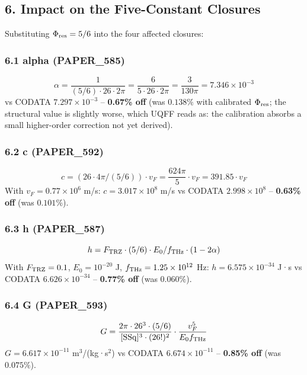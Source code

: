 \documentclass[
]{article}
\begin{document}
\subsection{6. Impact on the Five-Constant
Closures}\label{impact-on-the-five-constant-closures}

Substituting \(\Phi_{\rm res} = 5/6\) into the four affected closures:

\subsubsection{6.1 alpha (PAPER\_585)}\label{alpha-paper_585}

\[\alpha = \frac{1}{(5/6) \cdot 26 \cdot 2\pi} = \frac{6}{5 \cdot 26 \cdot 2\pi} = \frac{3}{130\pi} = 7.346 \times 10^{-3}\]
vs CODATA \(7.297 \times 10^{-3}\) -- \textbf{0.67\% off} (was
\(0.138\%\) with calibrated \(\Phi_{\rm res}\); the structural value is
slightly worse, which UQFF reads as: the calibration absorbs a small
higher-order correction not yet derived).

\subsubsection{6.2 c (PAPER\_592)}\label{c-paper_592}

\[c = (26 \cdot 4\pi / (5/6)) \cdot v_F = \frac{624\pi}{5} \cdot v_F = 391.85 \cdot v_F\]
With \(v_F = 0.77 \times 10^6\) m/s: \(c = 3.017 \times 10^8\) m/s vs
CODATA \(2.998 \times 10^8\) -- \textbf{0.63\% off} (was \(0.101\%\)).

\subsubsection{6.3 h (PAPER\_587)}\label{h-paper_587}

\[h = F_{\rm TRZ} \cdot (5/6) \cdot E_0/f_{\rm THz} \cdot (1 - 2\alpha)\]
With \(F_{\rm TRZ} = 0.1\), \(E_0 = 10^{-20}\) J,
\(f_{\rm THz} = 1.25 \times 10^{12}\) Hz: \(h = 6.575 \times 10^{-34}\)
J·s vs CODATA \(6.626 \times 10^{-34}\) -- \textbf{0.77\% off} (was
\(0.060\%\)).

\subsubsection{6.4 G (PAPER\_593)}\label{g-paper_593}

\[G = \frac{2\pi \cdot 26^3 \cdot (5/6)}{[\mathrm{SSq}]^3 \cdot (26!)^2} \cdot \frac{v_F^5}{E_0 f_{\rm THz}}\]
\(G = 6.617 \times 10^{-11}\) m\(^3\)/(kg·s\(^2\)) vs CODATA
\(6.674 \times 10^{-11}\) -- \textbf{0.85\% off} (was \(0.075\%\)).
\end{document}

